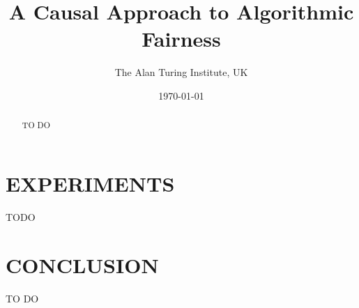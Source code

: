 \documentclass[12pt]{article}
\title{A Causal Approach to Algorithmic Fairness}
\author{The Alan Turing Institute, UK}
\date{\today}
\begin{document}
\maketitle

\begin{abstract}
  TO DO
\end{abstract}






















\section{EXPERIMENTS}

TODO

\section{CONCLUSION}

TO DO



\small{

}
\end{document}
